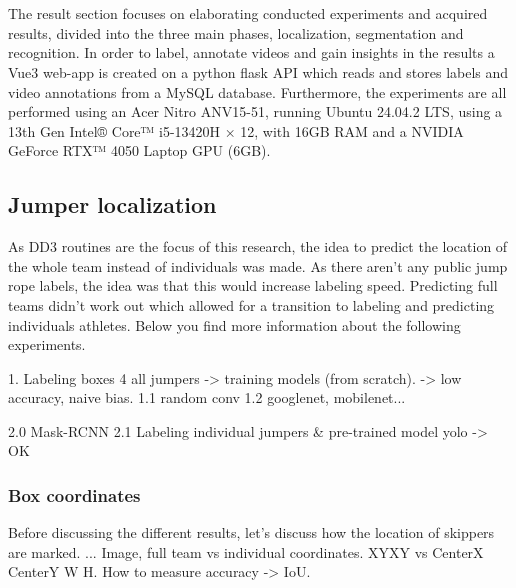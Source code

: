 
\chapter{}%
\label{ch:results}

The result section focuses on elaborating conducted experiments and acquired results, divided into the three main phases, localization, segmentation and recognition. In order to label, annotate videos and gain insights in the results a Vue3 web-app is created on a python flask API which reads and stores labels and video annotations from a MySQL database. Furthermore, the experiments are all performed using an Acer Nitro ANV15-51, running Ubuntu 24.04.2 LTS, using a 13th Gen Intel® Core™ i5-13420H × 12, with 16GB RAM and a NVIDIA GeForce RTX™ 4050 Laptop GPU (6GB).

\section{Jumper localization}

As DD3 routines are the focus of this research, the idea to predict the location of the whole team instead of individuals was made. As there aren't any public jump rope labels, the idea was that this would increase labeling speed. Predicting full teams didn't work out which allowed for a transition to labeling and predicting individuals athletes. Below you find more information about the following experiments.

1. Labeling boxes 4 all jumpers -> training models (from scratch). -> low accuracy, naive bias.
1.1 random conv
1.2 googlenet, mobilenet...

2.0 Mask-RCNN
2.1 Labeling individual jumpers \& pre-trained model yolo -> OK

\subsection{Box coordinates}

Before discussing the different results, let's discuss how the location of skippers are marked.
... Image, full team vs individual coordinates.
XYXY vs CenterX CenterY W H.
How to measure accuracy -> IoU.


